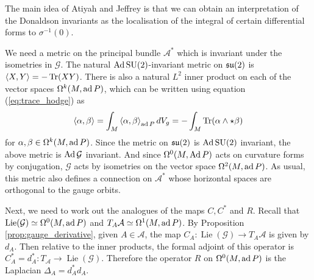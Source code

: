The main idea of Atiyah and Jeffrey is that we can 
obtain an interpretation of the Donaldson invariants as the
localisation of the integral of certain differential forms to $\sigma^{-1}(0)$.
 

We need a metric on the principal bundle $\mathcal{A}^*$ which is invariant 
under the isometries in $\mathcal{G}$. The natural $\operatorname{Ad} \operatorname{SU}(2)$-invariant metric 
on $\operatorname{\mathfrak{su}}(2)$ is $\gen{X,Y}=-\Tr(XY)$. There is also a natural $L^2$ inner product
on each of the vector spaces  $\Omega^k(M,\operatorname{ad} P)$, which  
can be written using equation (\ref{eq:trace_hodge}) as
\[
	\gen{\alpha,\beta} = \int_M \gen{\alpha,\beta}_{\ad P} dV_g = -\int_M
	\Tr(\alpha \wedge \star \beta)
\] 
for $\alpha,\beta\in \Omega^k(M,\operatorname{ad} P)$.
Since the metric on $\operatorname{\mathfrak{su}}(2)$ is  $\operatorname{Ad} \operatorname{SU}(2)$ invariant, the above metric is
$\operatorname{Ad} \mathcal{G}$ invariant. And since $\Omega^0(M,\operatorname{Ad} P)$ acts on curvature forms by
conjugation, $\mathcal{G}$ acts by isometries on the vector space $\Omega^2(M,\operatorname{ad} P)$.
As usual, this metric also defines a connection on $\mathcal{A}^*$ whose
horizontal spaces are orthogonal to the gauge orbits. 

Next, we need to work out the analogues of the maps $C,C^*$ and $R$. 
Recall that $\operatorname{Lie}(\mathcal{G}) \simeq
\Omega^0(M,\operatorname{ad} P)$ and $T_A \mathcal{A} \simeq \Omega^1(M,\operatorname{ad} P)$. 
By Proposition \ref{prop:gauge_derivative}, given $A \in \mathcal{A}$, the map 
$C_A : \operatorname{Lie}(\mathcal{G}) \to T_A \mathcal{A}$ is given by $d_A$.
Then relative to the inner products, the formal adjoint of this operator is 
$C_A^*=d_A^* : T_\mathcal{A} \to \operatorname{Lie}(\mathcal{G})$. 
Therefore the operator $R$ on $\Omega^0(M,\operatorname{ad} P)$ is the Laplacian
$\Delta_A=d^*_A d_A$. 

